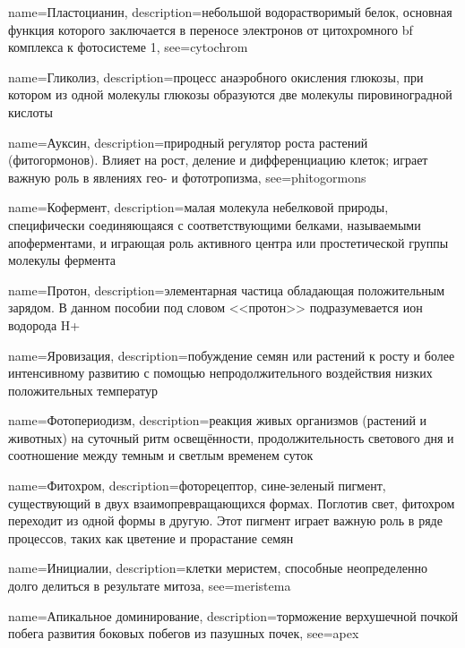 {
name={Пластоцианин},
description={небольшой водорастворимый белок, основная функция которого заключается в переносе электронов от цитохромного bf комплекса к фотосистеме 1},
see={cytochrom}
}


{
name={Гликолиз},
description={процесс анаэробного окисления глюкозы, при котором из одной молекулы глюкозы образуются две молекулы пировиноградной кислоты}
}

{
name={Ауксин},
description={природный регулятор роста растений (фитогормонов). Влияет на рост, деление и дифференциацию клеток; играет важную роль в явлениях гео- и фототропизма},
see={phitogormons}
}

{
name={Кофермент},
description={малая молекула небелковой природы, специфически соединяющаяся с соответствующими белками, называемыми апоферментами, и играющая роль активного центра или простетической группы молекулы фермента}
}

{
name={Протон},
description={элементарная частица обладающая положительным зарядом. В данном пособии под словом <<протон>> подразумевается ион водорода H+}
}

{
name={Яровизация},
description={побуждение семян или растений к росту и более интенсивному развитию с помощью непродолжительного воздействия низких положительных температур}
}

{
name={Фотопериодизм},
description={реакция живых организмов (растений и животных) на суточный ритм освещённости, продолжительность светового дня и соотношение между темным и светлым временем суток}
}

{
name={Фитохром},
description={фоторецептор, сине-зеленый пигмент, существующий в двух взаимопревращающихся формах. Поглотив свет, фитохром переходит из одной формы в другую. Этот пигмент играет важную роль в ряде процессов, таких как цветение и прорастание семян}
}

{
name={Инициалии},
description={клетки меристем, способные неопределенно долго делиться в результате митоза},
see={meristema}
}

{
name={Апикальное доминирование},
description={торможение верхушечной почкой побега развития боковых побегов из пазушных почек},
see={apex}
}

